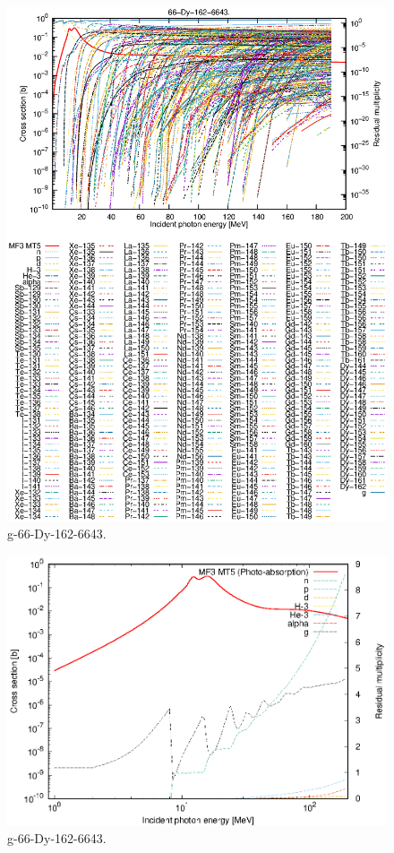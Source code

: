 \begin{figure}
 \includegraphics[width=\linewidth]{eps/g_66-Dy-162_6643.eps}
  \caption{g-66-Dy-162-6643.}
\end{figure}
\newpage \clearpage

\begin{figure}
 \includegraphics[width=\linewidth]{eps-log/g_66-Dy-162_6643.eps}
 \caption{g-66-Dy-162-6643.}
\end{figure}
\newpage \clearpage

